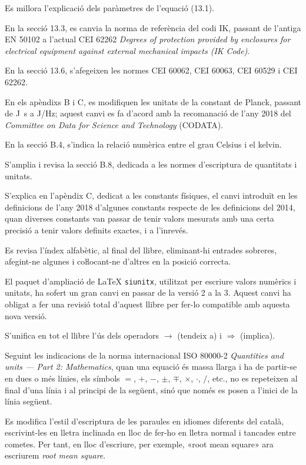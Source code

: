 Es millora l'explicació dels paràmetres de l'equació  (13.1).

En la  secció 13.3, es canvia la norma de referència del codi IK, passant de l'antiga EN 50102 a l'actual CEI 62262 \textit{Degrees of protection provided by enclosures for
electrical equipment against external mechanical impacts (IK Code)}.

En la secció 13.6, s'afegeixen les normes CEI 60062,  CEI 60063,  CEI 60529 i  CEI 62262.

En els apèndixs  B i C, es modifiquen les unitats de la constant de Planck, passant de \unit{J.s} a \unit{J/Hz}; aquest canvi es fa d'acord amb  la recomanació de l'any 2018 del \textit{Committee on Data for Science and Technology} (CODATA).

En la secció B.4, s'indica la relació numèrica entre el grau Celsius i el kelvin.

S'amplia i revisa la secció B.8, dedicada a les normes d'escriptura de quantitats i unitats.


S'explica en l'apèndix C, dedicat a les constants físiques,  el canvi introduït en les definicions de l'any 2018 d'algunes constants respecte de les definicions del 2014, quan diverses constants  van passar de tenir valors mesurats amb una certa precisió a tenir valors definits exactes, i a l'inrevés.

Es revisa l'índex alfabètic, al final del llibre, eliminant-hi entrades sobreres, afegint-ne algunes i coŀlocant-ne d'altres en la posició correcta.


El paquet d'ampliació de \LaTeX{} \texttt{siunitx}, utilitzat per escriure valors numèrics i unitats, ha sofert un gran canvi en passar de la versió 2 a la 3. Aquest canvi ha obligat a fer una  revisió total d'aquest llibre per  fer-lo compatible amb aquesta nova versió.

S'unifica en tot el llibre l'ús dels operadors $\rightarrow$ (tendeix a) i $\Rightarrow$ (implica).

Seguint les indicacions de la norma internacional ISO 80000-2 \textit{Quantities and units --- Part 2: Mathematics}, quan una equació és massa llarga i ha de partir-se en dues o més línies, els símbols $=$, $+$, $-$, $\pm$, $\mp$, $\times$, $\cdot$, $/$, etc., no es repeteixen al final d'una línia i al principi de la següent, sinó que només es posen a l'inici de la  línia següent.

Es modifica l'estil d'escriptura de les paraules en idiomes diferents del català, escrivint-les en lletra inclinada en lloc de fer-ho en lletra normal i tancades entre cometes. Per tant, en lloc d'escriure, per exemple, «root mean square» ara escriurem \textit{root mean square}.

